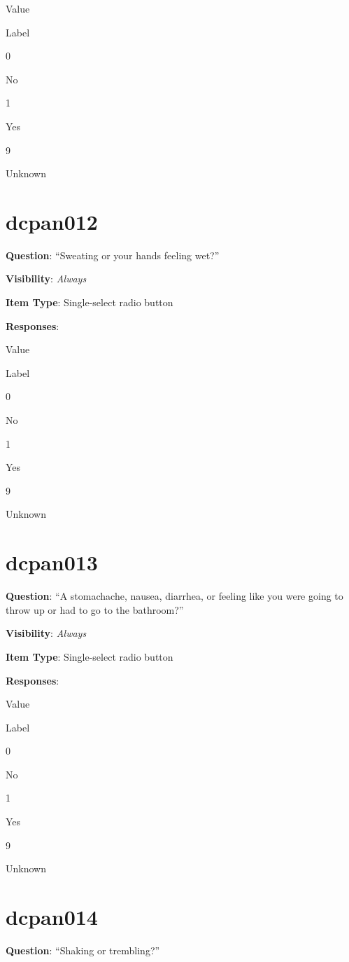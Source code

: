 \documentclass[]{book}
\begin{document}
Value

Label

0

No

1

Yes

9

Unknown

\hypertarget{dcpan012}{%
\section{dcpan012}\label{dcpan012}}

\textbf{Question}: ``Sweating or your hands feeling wet?''

\textbf{Visibility}: \emph{Always}

\textbf{Item Type}: Single-select radio button

\textbf{Responses}:

Value

Label

0

No

1

Yes

9

Unknown

\hypertarget{dcpan013}{%
\section{dcpan013}\label{dcpan013}}

\textbf{Question}: ``A stomachache, nausea, diarrhea, or feeling like you were going to throw up or had to go to the bathroom?''

\textbf{Visibility}: \emph{Always}

\textbf{Item Type}: Single-select radio button

\textbf{Responses}:

Value

Label

0

No

1

Yes

9

Unknown

\hypertarget{dcpan014}{%
\section{dcpan014}\label{dcpan014}}

\textbf{Question}: ``Shaking or trembling?''
\end{document}
